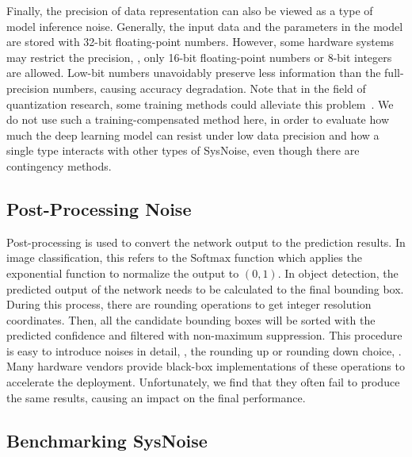 Finally, the precision of data representation can also be viewed as a type of model inference noise. Generally, the input data and the parameters in the model are stored with 32-bit floating-point numbers. 
However, some hardware systems may restrict the precision, \eg, only 16-bit floating-point numbers or 8-bit integers are allowed. 
Low-bit numbers unavoidably preserve less information than the full-precision numbers, causing accuracy degradation. 
Note that in the field of quantization research, some training methods could alleviate this problem~\cite{jacob2018quantization}. We do not use such a training-compensated method here, in order to evaluate how much the deep learning model can resist under low data precision and how a single type interacts with other types of SysNoise, even though there are contingency methods. 


\subsection{Post-Processing Noise}

Post-processing is used to convert the network output to the prediction results. In image classification, this refers to the $\mathrm{Softmax}$ function which applies the exponential function to normalize the output to $(0, 1)$. In object detection, the predicted output of the network needs to be calculated to the final bounding box. During this process, there are rounding operations to get integer resolution coordinates. Then, all the candidate bounding boxes will be sorted with the predicted confidence and filtered with non-maximum suppression. This procedure is easy to introduce noises in detail, \eg, the rounding up or rounding down choice, \etc. Many hardware vendors provide black-box implementations of these operations to accelerate the deployment. Unfortunately, we find that they often fail to produce the same results, causing an impact on the final performance.


\subsection{Benchmarking SysNoise}
\label{benchmark_sysnoise}


